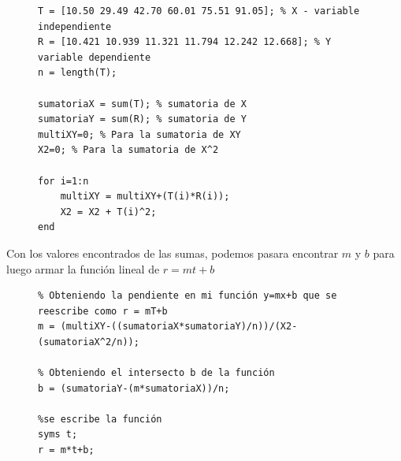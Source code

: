 \documentclass[11pt,letterpaper]{article}
\begin{document}
\begin{figure}[H]
\begin{tcolorbox}[title = Problema 1: Declaración de valores iniciales y sumatorias]
\begin{verbatim}
T = [10.50 29.49 42.70 60.01 75.51 91.05]; % X - variable independiente
R = [10.421 10.939 11.321 11.794 12.242 12.668]; % Y variable dependiente
n = length(T);

sumatoriaX = sum(T); % sumatoria de X
sumatoriaY = sum(R); % sumatoria de Y
multiXY=0; % Para la sumatoria de XY
X2=0; % Para la sumatoria de X^2

for i=1:n
    multiXY = multiXY+(T(i)*R(i));
    X2 = X2 + T(i)^2;
end
\end{verbatim}
\end{tcolorbox}
\end{figure}
Con los valores encontrados de las sumas, podemos pasara  encontrar $m$ y $b$ para luego armar la función lineal de $r=mt + b$
\begin{figure}[H]
\begin{tcolorbox}[title = Problema 1: Armando la función lineal de aproximación]
\begin{verbatim}
% Obteniendo la pendiente en mi función y=mx+b que se reescribe como r = mT+b
m = (multiXY-((sumatoriaX*sumatoriaY)/n))/(X2-(sumatoriaX^2/n));

% Obteniendo el intersecto b de la función
b = (sumatoriaY-(m*sumatoriaX))/n;

%se escribe la función
syms t;
r = m*t+b;
\end{verbatim}
\end{tcolorbox}
\end{figure}
\end{document}
